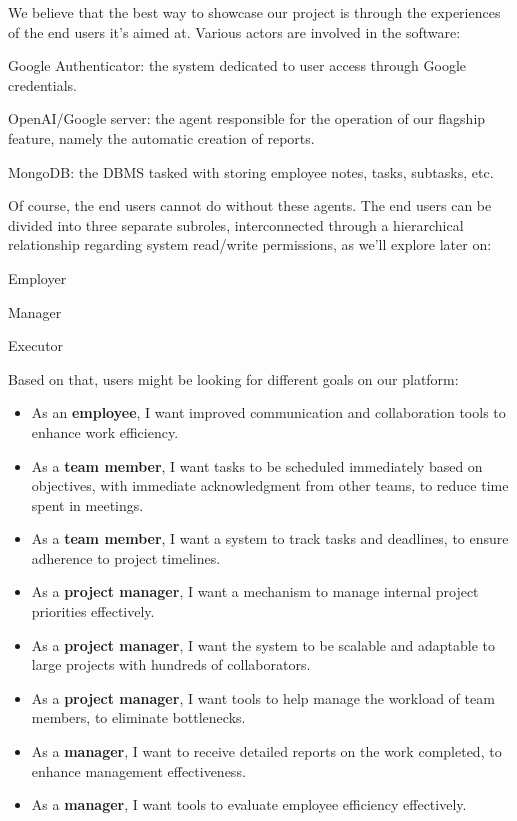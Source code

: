 \documentclass{article}
\begin{document}
We believe that the best way to showcase our project is through the experiences of the end users it's aimed at. Various actors are involved in the software:
\begin{itemsize}
  \item Google Authenticator: the system dedicated to user access through Google credentials.
  \item OpenAI/Google server: the agent responsible for the operation of our flagship feature, namely the automatic creation of reports.
  \item MongoDB: the DBMS tasked with storing employee notes, tasks, subtasks, etc.
\end{itemsize}
Of course, the end users cannot do without these agents. The end users can be divided into three separate subroles, interconnected through a hierarchical relationship regarding system read/write permissions, as we'll explore later on:
\begin{itemsize}
  \item Employer
  \item Manager
  \item Executor
\end{itemsize}

Based on that, users might be looking for different goals on our platform:
\begin{itemize}
    \item As an \textbf{employee}, I want improved communication and collaboration tools to enhance work efficiency.
    \item As a \textbf{team member}, I want tasks to be scheduled immediately based on objectives, with immediate acknowledgment from other teams, to reduce time spent in meetings.
    \item As a \textbf{team member}, I want a system to track tasks and deadlines, to ensure adherence to project timelines.
    \item As a \textbf{project manager}, I want a mechanism to manage internal project priorities effectively.
    \item As a \textbf{project manager}, I want the system to be scalable and adaptable to large projects with hundreds of collaborators.
    \item As a \textbf{project manager}, I want tools to help manage the workload of team members, to eliminate bottlenecks.
    \item As a \textbf{manager}, I want to receive detailed reports on the work completed, to enhance management effectiveness.
    \item As a \textbf{manager}, I want tools to evaluate employee efficiency effectively.
\end{itemize}
\end{document}
